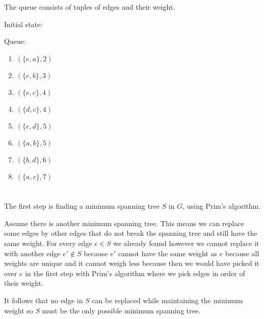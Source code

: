 \documentclass[12pt, a4paper]{article}
\begin{document}
\section{} %

The queue consists of tuples of edges and their weight.

Initial state:


Queue: \begin{enumerate}
	\item $(\{e, a\}, 2)$
	\item $(\{e, b\}, 3)$
	\item $(\{e, c\}, 4)$
	\item $(\{d, c\}, 4)$
	\item $(\{e, d\}, 5)$
	\item $(\{a, b\}, 5)$
	\item $(\{b, d\}, 6)$
	\item $(\{a, c\}, 7)$
\end{enumerate}

\section{} %

\section{} %

\section{} %

The first step is finding a minimum spanning tree $S$ in $G$, using Prim's algorithm.

Assume there is another minimum spanning tree. This means we can replace some edges by other edges that do not break the spanning tree and still have the same weight. For every edge $e \in S$ we already found however we cannot replace it with another edge $e' \not\in S$ because $e'$ cannot have the same weight as $e$ because all weights are unique and it cannot weigh less because then we would have picked it over $e$ in the first step with Prim's algorithm where we pick edges in order of their weight.

It follows that no edge in $S$ can be replaced while maintaining the minimum weight so $S$ must be the only possible minimum spanning tree.
\end{document}

